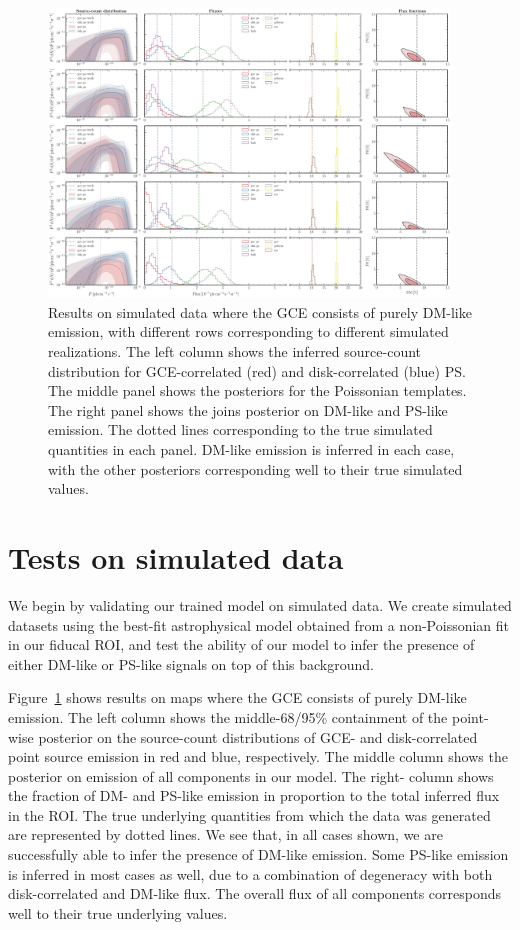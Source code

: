 \documentclass[prd,aps,10pt,nofootinbib,twocolumn,superscriptaddress,preprintnumbers,balancelastpage,longbibliography]{revtex4-1}
\begin{document}
%
\begin{figure}
    \centering
    \includegraphics[width=0.95\textwidth]{plots/sim_sbi_dm.pdf}
    \caption{Results on simulated data where the GCE consists of purely DM-like emission, with different rows corresponding to different simulated realizations. The left column shows the inferred source-count distribution for GCE-correlated (red) and disk-correlated (blue) PS. The middle panel shows the posteriors for the Poissonian templates. The right panel shows the joins posterior on DM-like and PS-like emission. The dotted lines corresponding to the true simulated quantities in each panel. DM-like emission is inferred in each case, with the other posteriors corresponding well to their true simulated values.} 
    \label{fig:sim_sbi_dm}
\end{figure}
%

\section{Tests on simulated data}
\label{sec:simulations}

We begin by validating our trained model on simulated data. We create simulated datasets using the best-fit astrophysical model obtained from a non-Poissonian fit in our fiducal ROI, and test the ability of our model to infer the presence of either DM-like or PS-like signals on top of this background.

Figure~\ref{fig:sim_sbi_dm} shows results on maps where the GCE consists of purely DM-like emission. The left column shows the middle-68/95\% containment of the point-wise posterior on the source-count distributions of GCE- and disk-correlated point source emission in red and blue, respectively. The middle column shows the posterior on emission of all components in our model. The right- column shows the fraction of DM- and PS-like emission in proportion to the total inferred flux in the ROI. The true underlying quantities from which the data was generated are represented by dotted lines. We see that, in all cases shown, we are successfully able to infer the presence of DM-like emission. Some PS-like emission is inferred in most cases as well, due to a combination of degeneracy with both disk-correlated and DM-like flux. The overall flux of all components corresponds well to their true underlying values.
\end{document}
